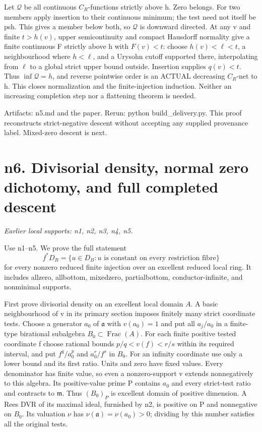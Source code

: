 \documentclass[11pt]{article}
\begin{document}
Let \(\mathcal Q\) be all continuous \(C_R\)-functions strictly above h. Zero belongs. For two members apply insertion to their continuous minimum; the test need not itself be psh. This gives a member below both, so \(\mathcal Q\) is downward directed. At any v and finite \(t>h(v)\), upper semicontinuity and compact Hausdorff normality give a finite continuous F strictly above h with \(F(v)<t\): choose \(h(v)<\ell<t\), a neighbourhood where \(h<\ell\), and a Urysohn cutoff supported there, interpolating from \(\ell\) to a global strict upper bound outside. Insertion supplies \(q(v)<t\). Thus \(\inf\mathcal Q=h\), and reverse pointwise order is an ACTUAL decreasing \(C_R\)-net to h. This closes normalization and the finite-injection induction. Neither an increasing completion step nor a flattening theorem is needed.

Artifacts: n5.md and the paper. Rerun: python build\_delivery.py. This proof reconstructs strict-negative descent without accepting any supplied provenance label. Mixed-zero descent is next.

\section{n6. Divisorial density, normal zero dichotomy, and full completed descent}
\textit{Earlier local supports: n1, n2, n3, n4, n5.}

Use n1--n5. We prove the full statement
\[
f^*D_R=\{u\in D_B:u\text{ is constant on every restriction fibre}\}
\]
for every nonzero reduced finite injection over an excellent reduced local ring. It includes allzero, allbottom, mixedzero, partialbottom, conductor-infinite, and nonminimal supports.

First prove divisorial density on an excellent local domain \(A\). A basic neighbourhood of v in its primary section imposes finitely many strict coordinate tests. Choose a generator \(a_0\) of \(\mathfrak a\) with \(v(a_0)=1\) and put all \(a_j/a_0\) in a finite-type birational subalgebra \(B_0\subset\operatorname{Frac}(A)\). For each finite positive tested coordinate f choose rational bounds \(p/q<v(f)<r/s\) within its required interval, and put \(f^q/a_0^p\) and \(a_0^r/f^s\) in \(B_0\). For an infinity coordinate use only a lower bound and its first ratio. Units and zero have fixed values. Every denominator has finite value, so even a nonzero-support v extends nonnegatively to this algebra. Its positive-value prime P contains \(a_0\) and every strict-test ratio and contracts to \(\mathfrak m\). Thus \((B_0)_P\) is excellent domain of positive dimension. A Rees DVR of its maximal ideal, furnished by n2, is positive on P and nonnegative on \(B_0\). Its valuation \(\nu\) has \(\nu(\mathfrak a)=\nu(a_0)>0\); dividing by this number satisfies all the original tests.
\end{document}
